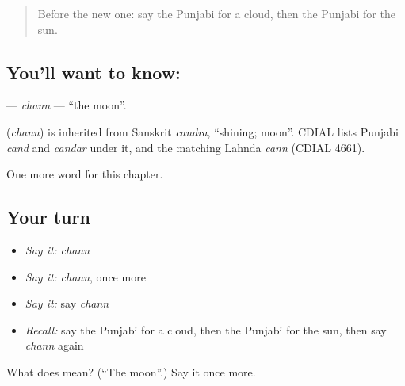\begin{quote}
Before the new one: say the Punjabi for a cloud, then the Punjabi for the sun.
\end{quote}

\subsection*{You'll want to know: }
\textbf{} — \emph{chann} — \textquotedblleft{}the moon\textquotedblright{}.

\begin{cousinweb}
\textbf{} (\emph{chann}) is inherited from Sanskrit \emph{candra}, \textquotedblleft{}shining; moon\textquotedblright{}. CDIAL lists Punjabi \emph{cand} and \emph{candar} under it, and the matching Lahnda \emph{cann} (CDIAL 4661).
\end{cousinweb}

\begin{grammarlens}[title={What you've built}]
One more word for this chapter.
\end{grammarlens}

\subsection*{Your turn}
\begin{itemize}
\raggedright
  \item \emph{Say it:} \emph{chann}
  \item \emph{Say it:} \emph{chann}, once more
  \item \emph{Say it:} say \emph{chann}
  \item \emph{Recall:} say the Punjabi for a cloud, then the Punjabi for the sun, then say \emph{chann} again
\end{itemize}

\begin{tcolorbox}[breakable,colback=teal!4,colframe=teal!35!black,title={Before you move on}]
What does  mean? (\textquotedblleft{}The moon\textquotedblright{}.) Say it once more.
\end{tcolorbox}
